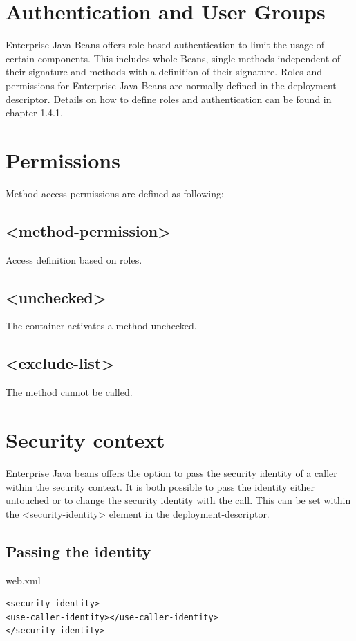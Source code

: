 \documentclass[12pt,a4paper]{report}
\begin{document}
\section{Authentication and User Groups}
Enterprise Java Beans offers role-based authentication to limit the usage of certain components. This includes whole Beans, single methods independent of their signature and methods with a definition of their signature.
Roles and permissions for Enterprise Java Beans are normally defined in the deployment descriptor. Details on how to define roles and authentication can be found in chapter 1.4.1.

\section{Permissions}
Method access permissions are defined as following:

\subsection{<method-permission>}
Access definition based on roles.

\subsection{<unchecked>}
The container activates a method unchecked.

\subsection{<exclude-list>}
The method cannot be called.

\section{Security context}
Enterprise Java beans offers the option to pass the security identity of a caller within the security context. It is both possible to pass the identity either untouched or to change the security identity with the call. This can be set within the <security-identity> element in the deployment-descriptor.

\subsection{Passing the identity}
\begin{bclogo}[couleur=yellow!15,arrondi=0.1,logo=\bccrayon, ombre = true]{web.xml}
\begin{lstlisting}[style=XML]
<security-identity>
<use-caller-identity></use-caller-identity>
</security-identity>
\end{lstlisting}
\end{bclogo}
\end{document}
